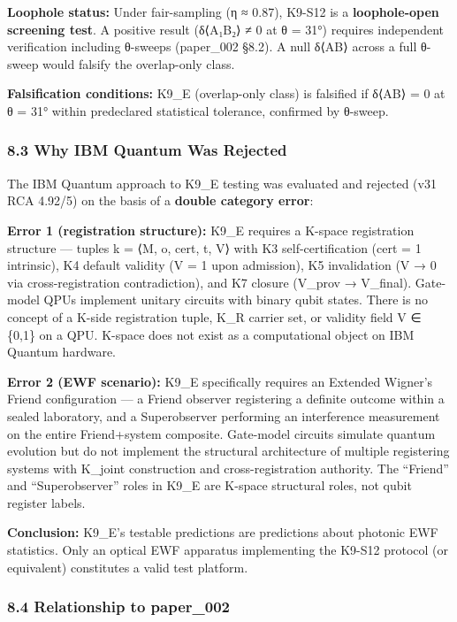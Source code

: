 \documentclass[
  11pt,
]{article}
\begin{document}
\textbf{Loophole status:} Under fair-sampling (η ≈ 0.87), K9-S12 is a
\textbf{loophole-open screening test}. A positive result (δ⟨A₁B₂⟩ ≠ 0 at
θ = 31°) requires independent verification including θ-sweeps
(paper\_002 §8.2). A null δ⟨AB⟩ across a full θ-sweep would falsify the
overlap-only class.

\textbf{Falsification conditions:} K9\_E (overlap-only class) is
falsified if δ⟨AB⟩ = 0 at θ = 31° within predeclared statistical
tolerance, confirmed by θ-sweep.

\subsubsection{8.3 Why IBM Quantum Was
Rejected}\label{why-ibm-quantum-was-rejected}

The IBM Quantum approach to K9\_E testing was evaluated and rejected
(v31 RCA 4.92/5) on the basis of a \textbf{double category error}:

\textbf{Error 1 (registration structure):} K9\_E requires a K-space
registration structure --- tuples k = ⟨M, o, cert, t, V⟩ with K3
self-certification (cert = 1 intrinsic), K4 default validity (V = 1 upon
admission), K5 invalidation (V → 0 via cross-registration
contradiction), and K7 closure (V\_prov → V\_final). Gate-model QPUs
implement unitary circuits with binary qubit states. There is no concept
of a K-side registration tuple, K\_R carrier set, or validity field V ∈
\{0,1\} on a QPU. K-space does not exist as a computational object on
IBM Quantum hardware.

\textbf{Error 2 (EWF scenario):} K9\_E specifically requires an Extended
Wigner's Friend configuration --- a Friend observer registering a
definite outcome within a sealed laboratory, and a Superobserver
performing an interference measurement on the entire Friend+system
composite. Gate-model circuits simulate quantum evolution but do not
implement the structural architecture of multiple registering systems
with K\_joint construction and cross-registration authority. The
``Friend'' and ``Superobserver'' roles in K9\_E are K-space structural
roles, not qubit register labels.

\textbf{Conclusion:} K9\_E's testable predictions are predictions about
photonic EWF statistics. Only an optical EWF apparatus implementing the
K9-S12 protocol (or equivalent) constitutes a valid test platform.

\subsubsection{8.4 Relationship to
paper\_002}\label{relationship-to-paper_002}
\end{document}
